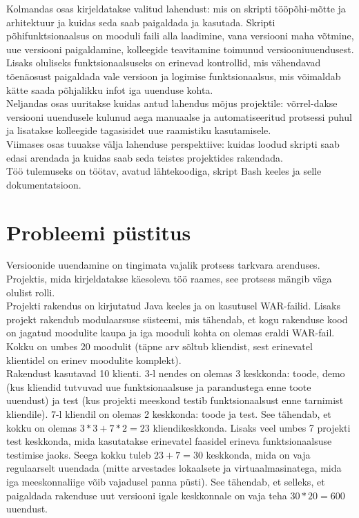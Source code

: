 \documentclass[12pt]{report}
\begin{document}
  Kolmandas osas kirjeldatakse valitud lahendust: mis on skripti tööpõhi-mõtte ja arhitektuur ja kuidas seda saab paigaldada ja kasutada. Skripti põhifunktsionaalsus on mooduli faili alla laadimine, vana versiooni maha võtmine, uue versiooni paigaldamine, kolleegide teavitamine toimunud versiooniuuendusest. Lisaks oluliseks funktsionaalsuseks on erinevad kontrollid, mis vähendavad tõenäosust paigaldada vale versioon ja logimise funktsionaalsus, mis võimaldab kätte saada põhjalikku infot iga uuenduse kohta.\\
  
  Neljandas osas uuritakse kuidas antud lahendus mõjus projektile: võrrel-dakse versiooni uuendusele kulunud aega manuaalse ja automatiseeritud protsessi puhul ja lisatakse kolleegide tagasisidet uue raamistiku kasutamisele.\\
  
  Viimases osas tuuakse välja lahenduse perspektiive: kuidas loodud skripti saab edasi arendada ja kuidas saab seda teistes projektides rakendada.\\
  
  Töö tulemuseks on töötav, avatud lähtekoodiga, skript Bash keeles ja selle dokumentatsioon.
  
  \newpage
  
  \section{Probleemi püstitus}
  
  Versioonide uuendamine on tingimata vajalik protsess tarkvara arenduses. Projektis, mida kirjeldatakse käesoleva töö raames, see protsess mängib väga olulist rolli.\\
  
  Projekti rakendus on kirjutatud Java keeles ja on kasutusel WAR\--failid. Lisaks projekt rakendub modulaarsuse süsteemi, mis tähendab, et kogu rakenduse kood on jagatud moodulite kaupa ja iga mooduli kohta on olemas eraldi WAR\--fail. Kokku on umbes 20 moodulit (täpne arv sõltub kliendist, sest erinevatel klientidel on erinev moodulite komplekt).\\
  
  Rakendust kasutavad 10 klienti. 3-l nendes on olemas 3 keskkonda: toode, demo (kus kliendid tutvuvad uue funktsionaalsuse ja parandustega enne toote uuendust) ja test (kus projekti meeskond testib funktsionaalsust enne tarnimist kliendile). 7-l kliendil on olemas 2 keskkonda: toode ja test. See tähendab, et kokku on olemas $3*3+7*2=23$ kliendikeskkonda. Lisaks veel umbes 7 projekti test keskkonda, mida kasutatakse erinevatel faasidel erineva funktsionaalsuse testimise jaoks. Seega kokku tuleb $23+7=30$ keskkonda, mida on vaja regulaarselt uuendada (mitte arvestades lokaalsete ja virtuaalmasinatega, mida iga meeskonnaliige võib vajadusel panna püsti). See tähendab, et selleks, et paigaldada rakenduse uut versiooni igale keskkonnale on vaja teha $30*20=600$ uuendust.\\
  
\end{document}
